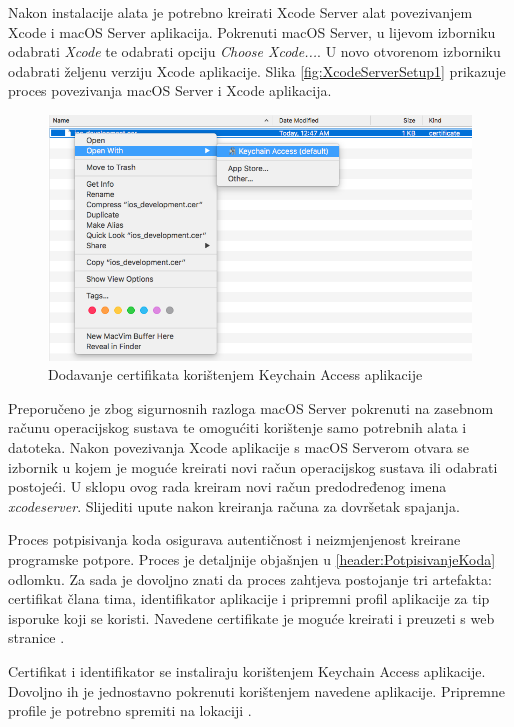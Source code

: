 \documentclass[times, utf8, diplomski, numeric]{fer}
\begin{document}
Nakon instalacije alata je potrebno kreirati Xcode Server alat povezivanjem Xcode i macOS Server aplikacija. Pokrenuti macOS Server, u lijevom izborniku odabrati \textit{Xcode} te odabrati opciju \textit{Choose Xcode...}. U novo otvorenom izborniku odabrati željenu verziju Xcode aplikacije. Slika \ref{fig:XcodeServerSetup1} prikazuje proces povezivanja macOS Server i Xcode aplikacija.

\begin{figure}[b!]
\centering
\includegraphics[scale=0.4]{DodavanjeCertifikata}
\caption{Dodavanje certifikata korištenjem Keychain Access aplikacije}
\label{fig:DodavanjeCertifikata}
\end{figure}

Preporučeno je zbog sigurnosnih razloga macOS Server pokrenuti na zasebnom računu operacijskog sustava te omogućiti korištenje samo potrebnih alata i datoteka. Nakon povezivanja Xcode aplikacije s macOS Serverom otvara se izbornik u kojem je moguće kreirati novi račun operacijskog sustava ili odabrati postojeći. U sklopu ovog rada kreiram novi račun predodređenog imena \textit{xcodeserver}. Slijediti upute nakon kreiranja računa za dovršetak spajanja.

Proces potpisivanja koda osigurava autentičnost i neizmjenjenost kreirane programske potpore. Proces je detaljnije objašnjen u \ref{header:PotpisivanjeKoda} odlomku. Za sada je dovoljno znati da proces zahtjeva postojanje tri artefakta: certifikat člana tima, identifikator aplikacije i pripremni profil aplikacije za tip isporuke koji se koristi. Navedene certifikate je moguće kreirati i preuzeti s web stranice .

Certifikat i identifikator se instaliraju korištenjem Keychain Access aplikacije. Dovoljno ih je jednostavno pokrenuti korištenjem navedene aplikacije. Pripremne profile je potrebno spremiti na lokaciji .
\end{document}

